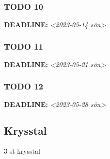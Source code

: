 \documentclass[11pt]{article}
\begin{document}
\subsubsection{{\bfseries\sffamily TODO} 10}
\label{sec:orga7f77db}
\noindent\textbf{DEADLINE:} \textit{<2023-05-14 sön>}\\[0pt]
\subsubsection{{\bfseries\sffamily TODO} 11}
\label{sec:orgc7d25c9}
\noindent\textbf{DEADLINE:} \textit{<2023-05-21 sön>}\\[0pt]
\subsubsection{{\bfseries\sffamily TODO} 12}
\label{sec:orgfd23bb0}
\noindent\textbf{DEADLINE:} \textit{<2023-05-28 sön>}\\[0pt]

\subsection{Krysstal}
\label{sec:org38df4ba}
3 st krysstal
\end{document}
